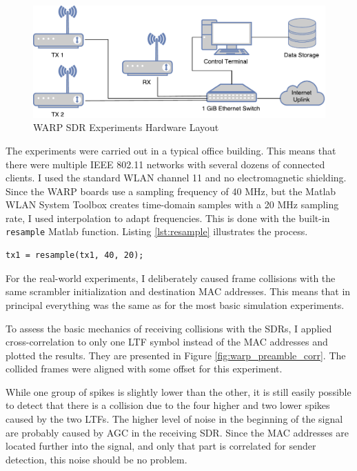\begin{figure}[H]
	\centering
	\includegraphics[width=\textwidth]{gfx/images/warp-layout}
	\caption{WARP SDR Experiments Hardware Layout}
	\label{fig:warp-layout}
\end{figure}

The experiments were carried out in a typical office building. This means that there were multiple IEEE 802.11 networks with several dozens of connected clients. I used the standard WLAN channel 11 and no electromagnetic shielding.\\

Since the \gls{WARP} boards use a sampling frequency of 40 MHz, but the Matlab WLAN System Toolbox creates time-domain samples with a 20 MHz sampling rate, I used interpolation to adapt frequencies. This is done with the built-in \texttt{resample} Matlab function. Listing \ref{lst:resample} illustrates the process.

\begin{lstlisting}[captionpos=b,caption={Interpolate Sampling Rate},label=lst:resample]
% Interpolate to get from 20 to 40 MHz sampling rate
tx1 = resample(tx1, 40, 20);
\end{lstlisting}

For the real-world experiments, I deliberately caused frame collisions with the same scrambler initialization and destination \gls{MAC} addresses. This means that in principal everything was the same as for the most basic simulation experiments.

To assess the basic mechanics of receiving collisions with the \glspl{SDR}, I applied cross-correlation to only one \gls{LTF} symbol instead of the \gls{MAC} addresses and plotted the results. They are presented in Figure \ref{fig:warp_preamble_corr}. The collided frames were aligned with some offset for this experiment.

While one group of spikes is slightly lower than the other, it is still easily possible to detect that there is a collision due to the four higher and two lower spikes caused by the two \glspl{LTF}. The higher level of noise in the beginning of the signal are probably caused by \gls{AGC} in the receiving \gls{SDR}. Since the \gls{MAC} addresses are located further into the signal, and only that part is correlated for sender detection, this noise should be no problem.

